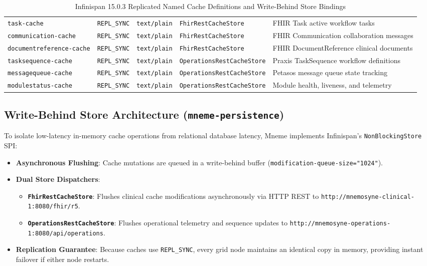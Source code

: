 \begin{table}[htbp]
\begin{tabularx}{\textwidth}{l l l l Y}
\texttt{task-cache} & \texttt{REPL\_SYNC} & \texttt{text/plain} & \texttt{FhirRestCacheStore} & FHIR Task active workflow tasks \\
\texttt{communication-cache} & \texttt{REPL\_SYNC} & \texttt{text/plain} & \texttt{FhirRestCacheStore} & FHIR Communication collaboration messages \\
\texttt{documentreference-cache} & \texttt{REPL\_SYNC} & \texttt{text/plain} & \texttt{FhirRestCacheStore} & FHIR DocumentReference clinical documents \\
\midrule
\texttt{tasksequence-cache} & \texttt{REPL\_SYNC} & \texttt{text/plain} & \texttt{OperationsRestCacheStore} & Praxis TaskSequence workflow definitions \\
\texttt{messagequeue-cache} & \texttt{REPL\_SYNC} & \texttt{text/plain} & \texttt{OperationsRestCacheStore} & Petasos message queue state tracking \\
\texttt{modulestatus-cache} & \texttt{REPL\_SYNC} & \texttt{text/plain} & \texttt{OperationsRestCacheStore} & Module health, liveness, and telemetry \\
\bottomrule
\end{tabularx}
\caption{Infinispan 15.0.3 Replicated Named Cache Definitions and Write-Behind Store Bindings}
\label{tab:infinispan_caches}
\end{table}

\subsection{Write-Behind Store Architecture (\texttt{mneme-persistence})}

To isolate low-latency in-memory cache operations from relational database latency, Mneme implements Infinispan's \texttt{NonBlockingStore} SPI:
\begin{itemize}
    \item \textbf{Asynchronous Flushing}: Cache mutations are queued in a write-behind buffer (\texttt{modification-queue-size="1024"}).
    \item \textbf{Dual Store Dispatchers}:
    \begin{itemize}
        \item \textbf{\texttt{FhirRestCacheStore}}: Flushes clinical cache modifications asynchronously via HTTP REST to \texttt{http://mnemosyne-clinical-1:8080/fhir/r5}.
        \item \textbf{\texttt{OperationsRestCacheStore}}: Flushes operational telemetry and sequence updates to \texttt{http://mnemosyne-operations-1:8080/api/operations}.
    \end{itemize}
    \item \textbf{Replication Guarantee}: Because caches use \texttt{REPL\_SYNC}, every grid node maintains an identical copy in memory, providing instant failover if either node restarts.
\end{itemize}


